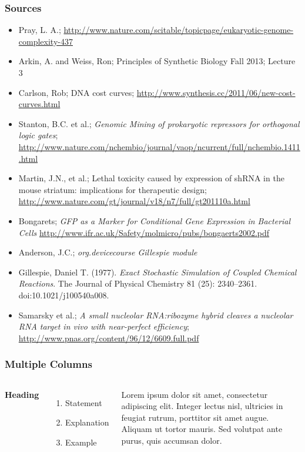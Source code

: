 \documentclass{beamer}
\begin{document}
\begin{frame}
\frametitle{Sources}

\begin{itemize}
\item Pray, L. A.; \url{http://www.nature.com/scitable/topicpage/eukaryotic-genome-complexity-437}
\item Arkin, A. and Weiss, Ron; Principles of Synthetic Biology Fall 2013; Lecture 3
\item Carlson, Rob; DNA cost curves; \url{http://www.synthesis.cc/2011/06/new-cost-curves.html}
\item Stanton, B.C. et al.; \emph{Genomic Mining of prokaryotic repressors for orthogonal logic gates};
  \url{http://www.nature.com/nchembio/journal/vaop/ncurrent/full/nchembio.1411.html}
\item Martin, J.N., et al.; Lethal toxicity caused by expression of shRNA in the mouse striatum: implications for therapeutic design;
  \url{http://www.nature.com/gt/journal/v18/n7/full/gt201110a.html}
\item Bongarets; \emph{GFP as a Marker for Conditional Gene Expression in Bacterial Cells}
  \url{http://www.ifr.ac.uk/Safety/molmicro/pubs/bongaerts2002.pdf}
\item Anderson, J.C.; \emph{org.devicecourse Gillespie module}
\item Gillespie, Daniel T. (1977). \emph{Exact Stochastic Simulation of Coupled Chemical Reactions}. The Journal of Physical Chemistry 81 (25): 2340–2361. doi:10.1021/j100540a008.
\item Samarsky et al.; \emph{A small nucleolar RNA:ribozyme hybrid cleaves a nucleolar RNA
target in vivo with near-perfect efficiency}; \url{http://www.pnas.org/content/96/12/6609.full.pdf}
\end{itemize}

\end{frame}

\begin{frame}
\frametitle{Multiple Columns}
\begin{columns}[c] %

\textbf{Heading}
\begin{enumerate}
\item Statement
\item Explanation
\item Example
\end{enumerate}

Lorem ipsum dolor sit amet, consectetur adipiscing elit. Integer lectus nisl, ultricies in feugiat rutrum, porttitor sit amet augue. Aliquam ut tortor mauris. Sed volutpat ante purus, quis accumsan dolor.

\end{columns}
\end{frame}
\end{document}
